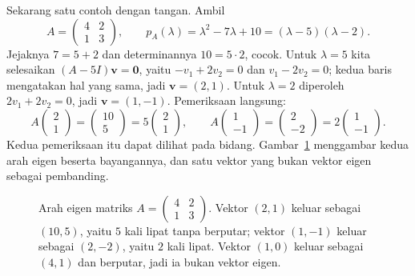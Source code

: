 Sekarang satu contoh dengan tangan. Ambil
\[
  A=\begin{pmatrix}4&2\\ 1&3\end{pmatrix},\qquad
  p_{A}(\lambda)=\lambda^{2}-7\lambda+10=(\lambda-5)(\lambda-2).
\]
Jejaknya $7=5+2$ dan determinannya $10=5\cdot2$, cocok. Untuk $\lambda=5$ kita selesaikan
$(A-5I)\mathbf{v}=\mathbf{0}$, yaitu $-v_{1}+2v_{2}=0$ dan $v_{1}-2v_{2}=0$; kedua baris
mengatakan hal yang sama, jadi $\mathbf{v}=(2,1)$. Untuk $\lambda=2$ diperoleh
$2v_{1}+2v_{2}=0$, jadi $\mathbf{v}=(1,-1)$. Pemeriksaan langsung:
\[
  A\begin{pmatrix}2\\ 1\end{pmatrix}=\begin{pmatrix}10\\ 5\end{pmatrix}=5
  \begin{pmatrix}2\\ 1\end{pmatrix},\qquad
  A\begin{pmatrix}1\\ -1\end{pmatrix}=\begin{pmatrix}2\\ -2\end{pmatrix}=2
  \begin{pmatrix}1\\ -1\end{pmatrix}.
\]
Kedua pemeriksaan itu dapat dilihat pada bidang. Gambar~\ref{fig:panah-eigen} menggambar kedua
arah eigen beserta bayangannya, dan satu vektor yang bukan vektor eigen sebagai pembanding.

\begin{figure}[htbp]
\centering
{}
\caption{Arah eigen matriks $A=\begin{pmatrix}4&2\\1&3\end{pmatrix}$. Vektor $(2,1)$ keluar
sebagai $(10,5)$, yaitu $5$ kali lipat tanpa berputar; vektor $(1,-1)$ keluar sebagai $(2,-2)$,
yaitu $2$ kali lipat. Vektor $(1,0)$ keluar sebagai $(4,1)$ dan berputar, jadi ia bukan vektor
eigen.}
\label{fig:panah-eigen}
\end{figure}

